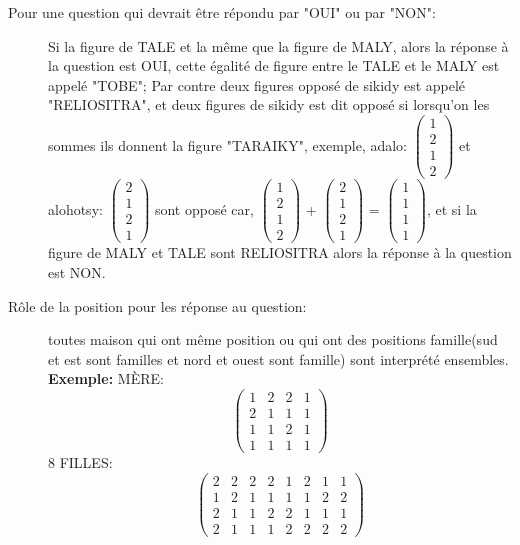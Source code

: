 \documentclass[12pt]{report}
\begin{document}
\begin{description}
\item[Pour une question qui devrait être répondu par "OUI" ou par "NON":] Si la figure de TALE et la même que la figure de MALY, alors la réponse à la question est OUI, cette égalité de figure entre le TALE et le MALY est appelé "TOBE"; Par contre deux figures opposé de sikidy est appelé "RELIOSITRA", et deux figures de sikidy est dit opposé si lorsqu'on les sommes ils donnent la figure "TARAIKY", exemple, adalo: $ \begin{pmatrix}
1\\
2\\
1\\
2
\end{pmatrix} $ et alohotsy: $ \begin{pmatrix}
2\\
1\\
2\\
1
\end{pmatrix} $ sont opposé car, $ \begin{pmatrix}
1\\
2\\
1\\
2
\end{pmatrix} $ + $ \begin{pmatrix}
2\\
1\\
2\\
1
\end{pmatrix} $ = $ \begin{pmatrix}
1\\
1\\
1\\
1
\end{pmatrix} $, et si la figure de MALY et TALE sont RELIOSITRA alors la réponse à la question est NON.

\item[Rôle de la position pour les réponse au question: ]toutes maison qui ont même position ou qui ont des positions famille(sud et est sont familles et nord et ouest sont famille) sont interprété ensembles.\newline
\textbf{Exemple:}\newline
MÈRE:\[
\begin{pmatrix}
1 & 2 & 2 & 1 \\
2 & 1 & 1 & 1 \\
1 & 1 & 2 & 1 \\
1 & 1 & 1 & 1 
\end{pmatrix}
\]
8 FILLES:
\[
\begin{pmatrix}
2 & 2 & 2 & 2 & 1 & 2 & 1 & 1\\
1 & 2 & 1 & 1 & 1 & 1 & 2 & 2\\
2 & 1 & 1 & 2 & 2 & 1 & 1 & 1\\
2 & 1 & 1 & 1 & 2 & 2 & 2 & 2
\end{pmatrix}
\]


\end{description}
\end{document}
